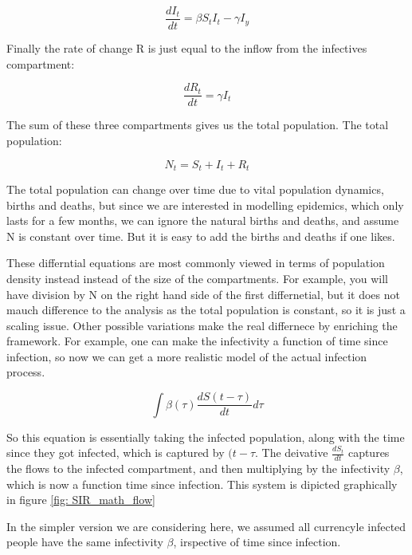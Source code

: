\documentclass[fontsize=17pt]{article}
\begin{document}
\begin{equation} \label{equ: infected}
\frac{dI_{t}}{dt}=\beta S_{t}I_{t}-\gamma I_{y}
\end{equation}

Finally the rate of change R is just equal to the inflow from the infectives compartment:

\begin{equation}
\frac{dR_{t}}{dt}=\gamma I_{t}
\end{equation}

The sum of these three compartments gives us the total population. The total population:

\begin{equation}
N_{t}=S_{t}+I_{t}+R_{t}
\end{equation}

The total population can change over time due to vital population dynamics, births and deaths, but since we are interested in modelling epidemics, which only lasts for a few months, we can ignore the natural births and deaths, and assume N is constant over time. But it is easy to add the births and deaths if one likes.

These differntial equations are most commonly viewed in terms of population density instead instead of the size of the compartments. For example, you will have division by N on the right hand side of the first differnetial, but it does not mauch difference to the analysis as the total population is constant, so it is just a scaling issue. Other possible variations make the real differnece by enriching the framework. For example, one can make the infectivity a function of time since infection, so now we can get a more realistic model of the actual infection process.

\begin{equation}
\int \beta(\tau)\frac{dS(t-\tau)}{dt}d\tau
\end{equation}


So this equation is essentially taking the infected population, along with the time since they got infected, which is captured by $(t-\tau$. The deivative $\frac{dS_{t}}{dt}$ captures the flows to the infected compartment, and then multiplying by the infectivity $\beta$, which is now a function time since infection. This system is dipicted graphically in figure \ref{fig: SIR_math_flow}

In the simpler version we are considering here, we assumed all currencyle infected people have the same infectivity $\beta$, irspective of time since infection.
\end{document}
